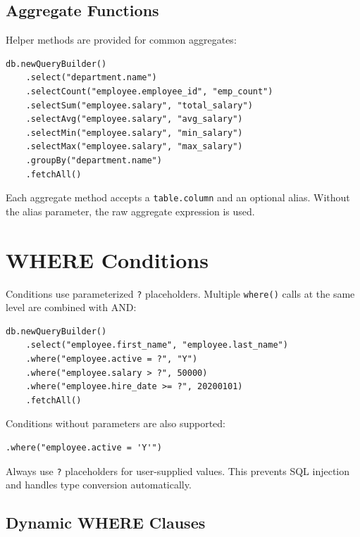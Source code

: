 \subsection{Aggregate Functions}

Helper methods are provided for common aggregates:

\begin{lstlisting}[style=groovy]
db.newQueryBuilder()
    .select("department.name")
    .selectCount("employee.employee_id", "emp_count")
    .selectSum("employee.salary", "total_salary")
    .selectAvg("employee.salary", "avg_salary")
    .selectMin("employee.salary", "min_salary")
    .selectMax("employee.salary", "max_salary")
    .groupBy("department.name")
    .fetchAll()
\end{lstlisting}

\noindent
Each aggregate method accepts a \texttt{table.column} and an optional alias.  Without the alias parameter, the raw aggregate expression is used.

\section{WHERE Conditions}
\label{sec:qb-where}

Conditions use parameterized \texttt{?} placeholders.  Multiple \texttt{where()} calls at the same level are combined with AND:

\begin{lstlisting}[style=groovy]
db.newQueryBuilder()
    .select("employee.first_name", "employee.last_name")
    .where("employee.active = ?", "Y")
    .where("employee.salary > ?", 50000)
    .where("employee.hire_date >= ?", 20200101)
    .fetchAll()
\end{lstlisting}

\noindent
Conditions without parameters are also supported:

\begin{lstlisting}[style=groovy]
.where("employee.active = 'Y'")
\end{lstlisting}

\begin{tipbox}
Always use \texttt{?} placeholders for user-supplied values.  This prevents SQL injection and handles type conversion automatically.
\end{tipbox}

\subsection{Dynamic WHERE Clauses}

